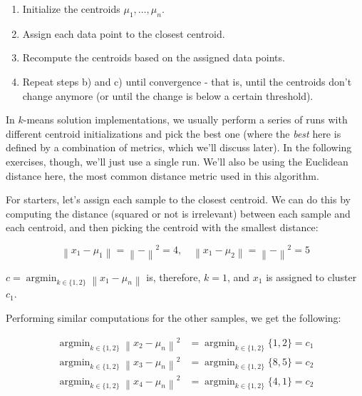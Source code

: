 \documentclass[12pt]{article}
\begin{document}
\begin{enumerate}[leftmargin=\labelsep]
  \begin{enumerate}
    \item Initialize the centroids $\mu_1, \ldots, \mu_n$.
    \item Assign each data point to the closest centroid.
    \item Recompute the centroids based on the assigned data points.
    \item Repeat steps b) and c) until convergence - that is, until the centroids don't change anymore
          (or until the change is below a certain threshold).
  \end{enumerate}

  In $k$-means solution implementations, we usually perform a series of runs with different
  centroid initializations and pick the best one (where the \textit{best} here
  is defined by a combination of metrics, which we'll discuss later). In the following
  exercises, though, we'll just use a single run. We'll also be using the Euclidean distance here,
  the most common distance metric used in this algorithm.

  For starters, let's assign each sample to the closest centroid. We can do this by computing
  the distance (squared or not is irrelevant) between each sample and each centroid, and then picking the centroid with the
  smallest distance:

  \begin{equation*}
    \left\| x_1 - \mu_1 \right\| = \left\|  -  \right\|^2 = 4, \quad
    \left\| x_1 - \mu_2 \right\| = \left\|  -  \right\|^2 = 5
  \end{equation*}

  $c = \operatorname{argmin}_{k \in \{1, 2\}} \left\| x_1 - \mu_n \right\|$ is, therefore, $k = 1$,
  and $x_1$ is assigned to cluster $c_1$.

  Performing similar computations for the other samples, we get the following:

  \begin{equation*}
    \begin{aligned}
      \operatorname{argmin}_{k \in \{1, 2\}} \left\| x_2 - \mu_n \right\|^2 & = \operatorname{argmin}_{k \in \{1, 2\}} \{1, 2\} = c_1 \\
      \operatorname{argmin}_{k \in \{1, 2\}} \left\| x_3 - \mu_n \right\|^2 & = \operatorname{argmin}_{k \in \{1, 2\}} \{8, 5\} = c_2 \\
      \operatorname{argmin}_{k \in \{1, 2\}} \left\| x_4 - \mu_n \right\|^2 & = \operatorname{argmin}_{k \in \{1, 2\}} \{4, 1\} = c_2
    \end{aligned}
  \end{equation*}


\end{enumerate}
\end{document}
